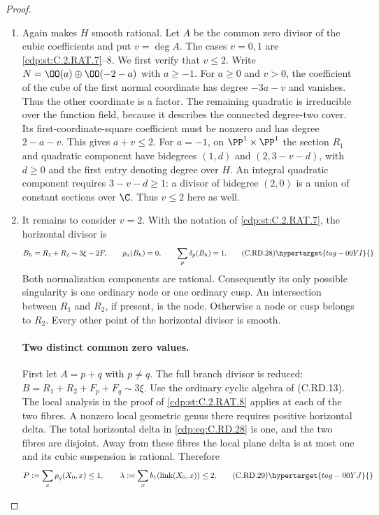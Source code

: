 \begin{proof}

\begin{enumerate}[label={$\langle1\rangle$\arabic*.},leftmargin=*]
\item Again  makes $H$ smooth rational. Let $A$ be the
common zero divisor of the cubic coefficients and put
$v=\deg A$. The cases $v=0,1$ are \ref{cdp:st:C.2.RAT.7}--8.
We first verify that $v\le2$. Write
$N=\OO(a)\oplus\OO(-2-a)$ with $a\ge-1$.
For $a\ge0$ and $v>0$, the coefficient of the cube
of the first normal coordinate has degree $-3a-v$
and vanishes. Thus the other coordinate is a factor.
The remaining quadratic is irreducible over the
function field, because it describes the connected
degree-two cover. Its first-coordinate-square
coefficient must be nonzero and has degree
$2-a-v$. This gives $a+v\le2$.
For $a=-1$, on $\PP^1\times\PP^1$ the section
$R_1$ and quadratic component have bidegrees
$(1,d)$ and $(2,3-v-d)$, with $d\ge0$ and the
first entry denoting degree over $H$. An integral
quadratic component requires $3-v-d\ge1$:
a divisor of bidegree $(2,0)$ is a union of
constant sections over $\C$. Thus $v\le2$ here
as well.

\item It remains to consider $v=2$. With the notation
of \ref{cdp:st:C.2.RAT.7}, the horizontal divisor is
\[
 B_h=R_1+R_2\sim3\xi-2F,
       \qquad p_a(B_h)=0,
       \qquad \sum_p\delta_p(B_h)=1.
\tag{C.RD.28}\hypertarget{tag-00YI}{}\label{cdp:eq:C.RD.28}
\]
Both normalization components are rational.
Consequently its only possible singularity is
one ordinary node or one ordinary cusp. An
intersection between $R_1$ and $R_2$, if present,
is the node. Otherwise a node or cusp belongs
to $R_2$. Every other point of the horizontal
divisor is smooth.

\paragraph{Two distinct common zero values.}
First let $A=p+q$ with $p\ne q$. The full branch
divisor is reduced:
$B=R_1+R_2+F_p+F_q\sim3\xi$.
Use the ordinary cyclic algebra of (C.RD.13).
The local analysis in the proof of \ref{cdp:st:C.2.RAT.8}
applies at each of the two fibres. A nonzero
local geometric genus there requires positive
horizontal delta. The total horizontal delta
in \eqref{cdp:eq:C.RD.28} is one, and the two fibres are
disjoint. Away from these fibres the local
plane delta is at most one and its cubic
suspension is rational. Therefore
\[
 P:=\sum_x p_g(X_0,x)\le1,\qquad
 \lambda:=\sum_x b_1(\operatorname{link}(X_0,x))\le2.
\tag{C.RD.29}\hypertarget{tag-00YJ}{}\label{cdp:eq:C.RD.29}
\]


\end{enumerate}
\end{proof}
